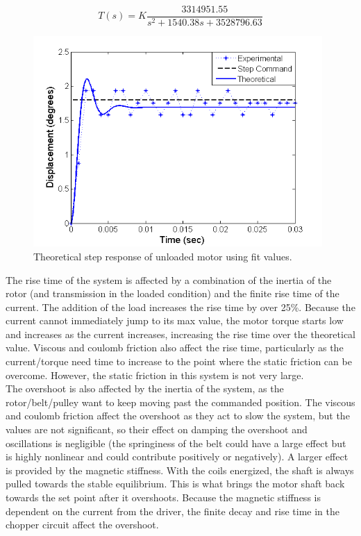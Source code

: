 \documentclass{article}
\theoremstyle{plain}
\theoremstyle{definition}
\theoremstyle{remark}
\begin{document}
\begin{equation}
\label{q3ai_E}
T(s) = K \frac{3314951.55}{s^2 + 1540.38 s + 3528796.63}
\end{equation}

\begin{figure}[hbt]
\begin{center}
\includegraphics[width = 11cm]{UnloadedStepFit.png}
\caption{Theoretical step response of unloaded motor using fit values.}
\label{q3ai_4}
\end{center}
\end{figure}
\vspace{3mm}
The rise time of the system is affected by a combination of the inertia of the rotor (and transmission in the loaded condition) and the finite rise time of the current. The addition of the load increases the rise time by over 25\%. Because the current cannot immediately jump to its max value, the motor torque starts low and increases as the current increases, increasing the rise time over the theoretical value. Viscous and coulomb friction also affect the rise time, particularly as the current/torque need time to increase to the point where the static friction can be overcome. However, the static friction in this system is not very large.\\

The overshoot is also affected by the inertia of the system, as the rotor/belt/pulley want to keep moving past the commanded position. The viscous and coulomb friction affect the overshoot as they act to slow the system, but the values are not significant, so their effect on damping the overshoot and oscillations is negligible (the springiness of the belt could have a large effect but is highly nonlinear and could contribute positively or negatively). A larger effect is provided by the magnetic stiffness. With the coils energized, the shaft is always pulled towards the stable equilibrium. This is what brings the motor shaft back towards the set point after it overshoots. Because the magnetic stiffness is dependent on the current from the driver, the finite decay and rise time in the chopper circuit affect the overshoot.\\
\end{document}

